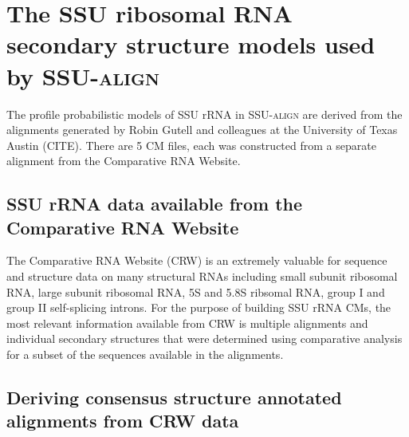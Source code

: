 \section{The SSU ribosomal RNA secondary structure models used by \textsc{SSU-align}}

The profile probabilistic models of SSU rRNA in \textsc{SSU-align} are
derived  from the alignments generated by Robin Gutell and colleagues at
the University of Texas Austin (CITE). There are 5 CM files, each was
constructed from a separate alignment from the Comparative RNA
Website. 

\subsection{SSU rRNA data available from the Comparative RNA Website}

The Comparative RNA Website (CRW) is an extremely valuable for
sequence and structure data on many structural RNAs including small
subunit ribosomal RNA, large subunit ribosomal RNA, 5S and 5.8S
ribsomal RNA, group I and group II self-splicing introns. For the
purpose of building SSU rRNA CMs, the most relevant information
available from CRW is multiple alignments and individual secondary
structures that were determined using comparative analysis for a
subset of the sequences available in the alignments. 

\subsection{Deriving consensus structure annotated alignments from CRW data}

